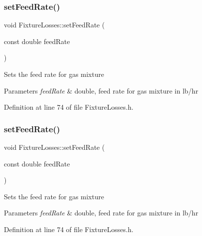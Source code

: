 \subsubsection{\texorpdfstring{set\+Feed\+Rate()}{setFeedRate()}\hspace{0.1cm}{\footnotesize\ttfamily [1/3]}}
{\footnotesize\ttfamily void Fixture\+Losses\+::set\+Feed\+Rate (\begin{DoxyParamCaption}\item[{const double}]{feed\+Rate }\end{DoxyParamCaption})\hspace{0.3cm}{\ttfamily [inline]}}

Sets the feed rate for gas mixture 
\begin{DoxyParams}{Parameters}
{\em feed\+Rate} & double, feed rate for gas mixture in lb/hr \\
\hline
\end{DoxyParams}


Definition at line 74 of file Fixture\+Losses.\+h.

\mbox{\label{class_fixture_losses_a6543643db6b28f3a78397c97d9c5135f}} 
\subsubsection{\texorpdfstring{set\+Feed\+Rate()}{setFeedRate()}\hspace{0.1cm}{\footnotesize\ttfamily [2/3]}}
{\footnotesize\ttfamily void Fixture\+Losses\+::set\+Feed\+Rate (\begin{DoxyParamCaption}\item[{const double}]{feed\+Rate }\end{DoxyParamCaption})\hspace{0.3cm}{\ttfamily [inline]}}

Sets the feed rate for gas mixture 
\begin{DoxyParams}{Parameters}
{\em feed\+Rate} & double, feed rate for gas mixture in lb/hr \\
\hline
\end{DoxyParams}


Definition at line 74 of file Fixture\+Losses.\+h.

\mbox{\label{class_fixture_losses_a6543643db6b28f3a78397c97d9c5135f}} 
